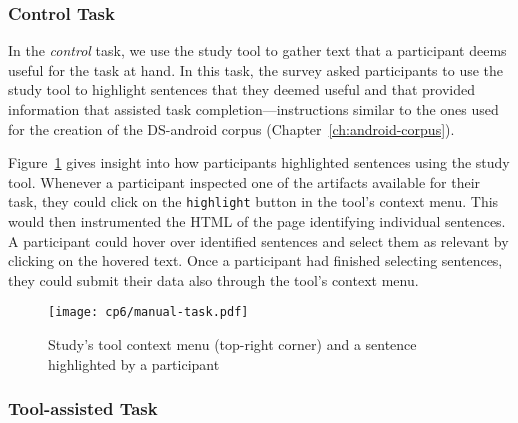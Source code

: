\subsubsection{Control Task}
\label{cp6:procedures-manual}



In the \textit{control} task, we use the study tool to gather text that a participant deems useful for the task at hand. In this task, 
the survey asked participants to use the study tool to highlight sentences that they deemed useful and that provided information that assisted task completion---instructions similar to the ones used for the creation of the \acs{DS-android} corpus (Chapter~\ref{ch:android-corpus}).



Figure~\ref{fig:artifact-pre-highlight}
gives insight into how participants highlighted sentences using the study tool. 
Whenever a participant inspected one of the artifacts available for their task, 
they could click on the \texttt{highlight} button in the tool's context menu.  
This would then instrumented the HTML of the page identifying individual sentences. 
A participant could hover over identified sentences and select them as relevant by clicking on the hovered text.
Once a participant had finished selecting sentences, they could submit 
their data also through the tool's context menu.





\begin{figure}
    \centering
    \texttt{[image: cp6/manual-task.pdf]}
    \caption{Study's tool context menu (top-right corner) and a sentence highlighted by a participant}
    \label{fig:artifact-pre-highlight}
\end{figure}




\subsubsection{Tool-assisted Task}
\label{cp6:procedures-tool-assisted}


